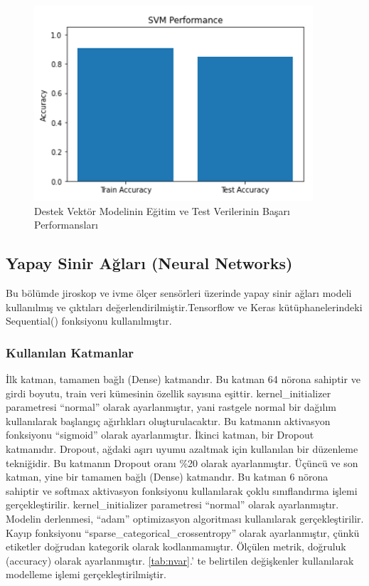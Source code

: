\documentclass[12pt,twoside]{deuthesis}
\begin{document}
\begin{figure}

{\centering \includegraphics[width=0.6\linewidth,height=0.25\textheight]{figure/jisvm_testtrain} 

}

\caption{Destek Vektör Modelinin Eğitim ve Test Verilerinin Başarı Performansları}\label{fig:jisvmtesttrain}
\end{figure}
\hypertarget{yapay-sinir-aux11flarux131-neural-networks-2}{%
\subsection{Yapay Sinir Ağları (Neural Networks)}\label{yapay-sinir-aux11flarux131-neural-networks-2}}

Bu bölümde jiroskop ve ivme ölçer sensörleri üzerinde yapay sinir ağları modeli kullanılmış ve çıktıları değerlendirilmiştir.Tensorflow ve Keras kütüphanelerindeki Sequential() fonksiyonu kullanılmıştır.

\hypertarget{kullanux131lan-katmanlar-2}{%
\subsubsection{Kullanılan Katmanlar}\label{kullanux131lan-katmanlar-2}}

İlk katman, tamamen bağlı (Dense) katmandır. Bu katman 64 nörona sahiptir ve girdi boyutu, train veri kümesinin özellik sayısına eşittir. kernel\_initializer parametresi ``normal'' olarak ayarlanmıştır, yani rastgele normal bir dağılım kullanılarak başlangıç ağırlıkları oluşturulacaktır. Bu katmanın aktivasyon fonksiyonu ``sigmoid'' olarak ayarlanmıştır.
İkinci katman, bir Dropout katmanıdır. Dropout, ağdaki aşırı uyumu azaltmak için kullanılan bir düzenleme tekniğidir. Bu katmanın Dropout oranı \%20 olarak ayarlanmıştır.
Üçüncü ve son katman, yine bir tamamen bağlı (Dense) katmandır. Bu katman 6 nörona sahiptir ve softmax aktivasyon fonksiyonu kullanılarak çoklu sınıflandırma işlemi gerçekleştirilir. kernel\_initializer parametresi ``normal'' olarak ayarlanmıştır.
Modelin derlenmesi, ``adam'' optimizasyon algoritması kullanılarak gerçekleştirilir. Kayıp fonksiyonu ``sparse\_categorical\_crossentropy'' olarak ayarlanmıştır, çünkü etiketler doğrudan kategorik olarak kodlanmamıştır. Ölçülen metrik, doğruluk (accuracy) olarak ayarlanmıştır.
\ref{tab:nvar}.' te belirtilen değişkenler kullanılarak modelleme işlemi gerçekleştirilmiştir.
\end{document}
